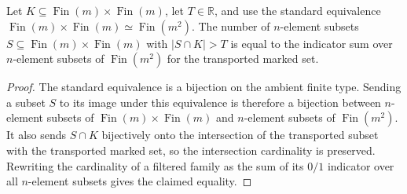 \begin{helper}[FinProductTailCountEquiv]
\label{helper:FinProductTailCountEquiv}
Let \(K\subseteq \operatorname{Fin}(m)\times\operatorname{Fin}(m)\), let
\(T\in\mathbb R\), and use the standard equivalence
\(\operatorname{Fin}(m)\times\operatorname{Fin}(m)\simeq
\operatorname{Fin}(m^2)\).  The number of \(n\)-element subsets
\(S\subseteq\operatorname{Fin}(m)\times\operatorname{Fin}(m)\) with
\(|S\cap K|>T\) is equal to the indicator sum over \(n\)-element subsets of
\(\operatorname{Fin}(m^2)\) for the transported marked set.
\end{helper}
\begin{proof}
The standard equivalence is a bijection on the ambient finite type.  Sending a
subset \(S\) to its image under this equivalence is therefore a bijection
between \(n\)-element subsets of
\(\operatorname{Fin}(m)\times\operatorname{Fin}(m)\) and \(n\)-element subsets
of \(\operatorname{Fin}(m^2)\).  It also sends \(S\cap K\) bijectively onto
the intersection of the transported subset with the transported marked set,
so the intersection cardinality is preserved.  Rewriting the cardinality of a
filtered family as the sum of its \(0/1\) indicator over all \(n\)-element
subsets gives the claimed equality.
\end{proof}

